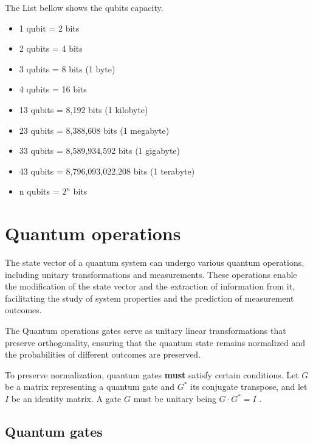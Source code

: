 		\par The List bellow shows the qubits capacity.
		
		\begin{itemize}
			\label{lst:qubits}
			\item 1 qubit = 2 bits
			\item 2 qubits = 4 bits
			\item 3 qubits = 8 bits (1 byte)
			\item 4 qubits = 16 bits
			\item 13 qubits = 8,192 bits (1 kilobyte)
			\item 23 qubits = 8,388,608 bits (1 megabyte)
			\item 33 qubits = 8,589,934,592 bits (1 gigabyte)
			\item 43 qubits = 8,796,093,022,208 bits (1 terabyte)
			\item n qubits = $2^n$ bits
		\end{itemize}
	
	
	\section{Quantum operations}
		\label{sec:quantumOperations}
				
		\par The state vector of a quantum system can undergo various quantum operations, including unitary transformations and measurements. These operations enable the modification of the state vector and the extraction of information from it, facilitating the study of system properties and the prediction of measurement outcomes.\newline
		
		\par The Quantum operations gates serve as unitary linear transformations that preserve orthogonality, ensuring that the quantum state remains normalized and the probabilities of different outcomes are preserved.\newline
		
		\par To preserve normalization, quantum gates \textbf{must} satisfy certain conditions. Let $G$ be a matrix representing a quantum gate and $G^*$ its conjugate transpose, and let $I$ be an identity matrix. A gate $G$ must be unitary being $G \cdot G^* = I$ \cite{da2018introduccao}.
		
		\subsection{Quantum gates}
		
